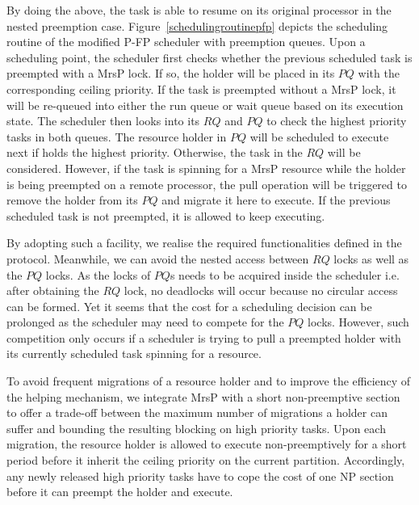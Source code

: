 \documentclass{report}
\begin{document}
By doing the above, the task is able to resume on its original processor in the nested preemption case. Figure~\ref{schedulingroutinepfp} depicts the scheduling routine of the modified P-FP scheduler with preemption queues. Upon a scheduling point, the scheduler first checks whether the previous scheduled task is preempted with a MrsP lock. If so, the holder will be placed in its $PQ$ with the corresponding ceiling priority. If the task is preempted without a MrsP lock, it will be re-queued into either the run queue or wait queue based on its execution state. The scheduler then looks into its $RQ$ and $PQ$ to check the highest priority tasks in both queues. The resource holder in $PQ$ will be scheduled to execute next if holds the highest priority. Otherwise, the task in the $RQ$ will be considered. However, if the task is spinning for a MrsP resource while the holder is being preempted on a remote processor, the pull operation will be triggered to remove the holder from its $PQ$ and migrate it here to execute. If the previous scheduled task is not preempted, it is allowed to keep executing.

By adopting such a facility, we realise the required functionalities defined in the protocol. Meanwhile, we can avoid the nested access between $RQ$ locks as well as the $PQ$ locks. As the locks of $PQ$s needs to be acquired inside the scheduler i.e. after obtaining the $RQ$ lock, no deadlocks will occur because no circular access can be formed. Yet it seems that the cost for a scheduling decision can be prolonged as the scheduler may need to compete for the $PQ$ locks. However, such competition only occurs if a scheduler is trying to pull a preempted holder with its currently scheduled task spinning for a resource.

To avoid frequent migrations of a resource holder and to improve the efficiency of the helping mechanism, we integrate MrsP with a short non-preemptive section to offer a trade-off between the maximum number of migrations a holder can suffer and bounding the resulting blocking on high priority tasks. Upon each migration, the resource holder is allowed to execute non-preemptively for a short period before it inherit the ceiling priority on the current partition. Accordingly, any newly released high priority tasks have to cope the cost of one NP section before it can preempt the holder and execute.
\end{document}
